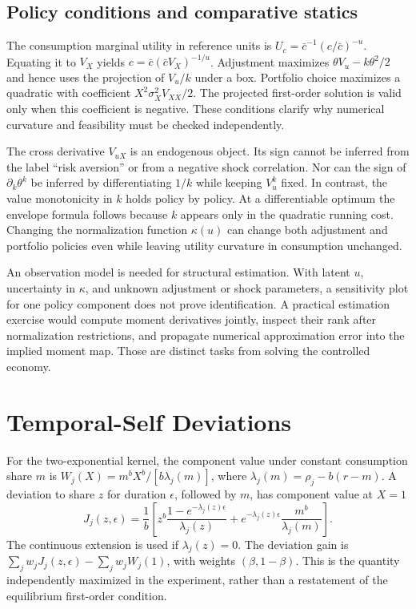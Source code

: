 \documentclass[ecta,draft]{econsocart}
\begin{document}
\subsection{Policy conditions and comparative statics}
The consumption marginal utility in reference units is $U_c=\bar c^{-1}(c/\bar c)^{-u}$. Equating it to $V_X$ yields $c=\bar c(\bar cV_X)^{-1/u}$. Adjustment maximizes $\theta V_u-k\theta^2/2$ and hence uses the projection of $V_u/k$ under a box. Portfolio choice maximizes a quadratic with coefficient $X^2\sigma_X^2V_{XX}/2$. The projected first-order solution is valid only when this coefficient is negative. These conditions clarify why numerical curvature and feasibility must be checked independently.

The cross derivative $V_{uX}$ is an endogenous object. Its sign cannot be inferred from the label ``risk aversion'' or from a negative shock correlation. Nor can the sign of $\partial_k\theta^k$ be inferred by differentiating $1/k$ while keeping $V_u^k$ fixed. In contrast, the value monotonicity in $k$ holds policy by policy. At a differentiable optimum the envelope formula follows because $k$ appears only in the quadratic running cost. Changing the normalization function $\kappa(u)$ can change both adjustment and portfolio policies even while leaving utility curvature in consumption unchanged.

An observation model is needed for structural estimation. With latent $u$, uncertainty in $\kappa$, and unknown adjustment or shock parameters, a sensitivity plot for one policy component does not prove identification. A practical estimation exercise would compute moment derivatives jointly, inspect their rank after normalization restrictions, and propagate numerical approximation error into the implied moment map. Those are distinct tasks from solving the controlled economy.

\section{Temporal-Self Deviations}
For the two-exponential kernel, the component value under constant consumption share $m$ is $W_j(X)=m^bX^b/[b\lambda_j(m)]$, where $\lambda_j(m)=\rho_j-b(r-m)$. A deviation to share $z$ for duration $\epsilon$, followed by $m$, has component value at $X=1$
\[
 J_j(z,\epsilon)=\frac1b\left[
 z^b\frac{1-e^{-\lambda_j(z)\epsilon}}{\lambda_j(z)}
 +e^{-\lambda_j(z)\epsilon}\frac{m^b}{\lambda_j(m)}\right].
\]
The continuous extension is used if $\lambda_j(z)=0$. The deviation gain is $\sum_jw_jJ_j(z,\epsilon)-\sum_jw_jW_j(1)$, with weights $(\beta,1-\beta)$. This is the quantity independently maximized in the experiment, rather than a restatement of the equilibrium first-order condition.
\end{document}

